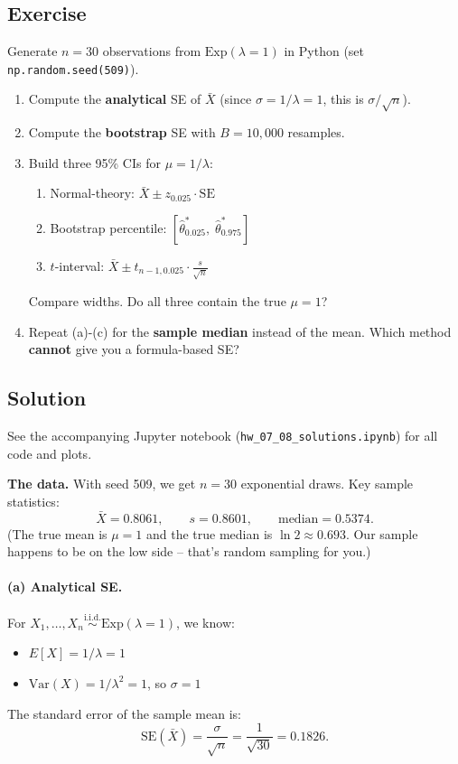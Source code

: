 \documentclass[11pt]{article}
\begin{document}
\subsection*{Exercise}

Generate $n = 30$ observations from $\text{Exp}(\lambda = 1)$ in Python (set \texttt{np.random.seed(509)}).

\begin{enumerate}[label=\alph*)]
  \item Compute the \textbf{analytical} SE of $\bar{X}$ (since $\sigma = 1/\lambda = 1$, this is $\sigma / \sqrt{n}$).
  \item Compute the \textbf{bootstrap} SE with $B = 10{,}000$ resamples.
  \item Build three 95\% CIs for $\mu = 1/\lambda$:
  \begin{enumerate}[label=(\roman*)]
    \item Normal-theory: $\bar{X} \pm z_{0.025} \cdot \text{SE}$
    \item Bootstrap percentile: $[\hat{\theta}^*_{0.025},\; \hat{\theta}^*_{0.975}]$
    \item $t$-interval: $\bar{X} \pm t_{n-1, 0.025} \cdot \frac{s}{\sqrt{n}}$
  \end{enumerate}
  Compare widths. Do all three contain the true $\mu = 1$?
  \item Repeat (a)-(c) for the \textbf{sample median} instead of the mean. Which method \textbf{cannot} give you a formula-based SE?
\end{enumerate}

\subsection*{Solution}

See the accompanying Jupyter notebook (\texttt{hw\_07\_08\_solutions.ipynb}) for all code and plots.

\textbf{The data.} With seed 509, we get $n=30$ exponential draws. Key sample statistics:
\[
  \bar{X} = 0.8061, \qquad s = 0.8601, \qquad \text{median} = 0.5374.
\]
(The true mean is $\mu = 1$ and the true median is $\ln 2 \approx 0.693$. Our sample happens to be on the low side -- that's random sampling for you.)

\paragraph{(a) Analytical SE.}

For $X_1, \ldots, X_n \overset{\text{i.i.d.}}{\sim} \text{Exp}(\lambda = 1)$, we know:
\begin{itemize}
  \item $E[X] = 1/\lambda = 1$
  \item $\text{Var}(X) = 1/\lambda^2 = 1$, so $\sigma = 1$
\end{itemize}
The standard error of the sample mean is:
\[
  \text{SE}(\bar{X}) = \frac{\sigma}{\sqrt{n}} = \frac{1}{\sqrt{30}} = \boxed{0.1826}.
\]
\end{document}
